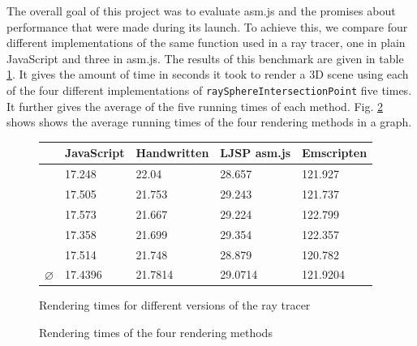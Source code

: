 \documentclass[11pt]{report}
\begin{document}
The overall goal of this project was to evaluate asm.js and the promises about performance that were made during its launch. To achieve this, we compare four different implementations of the same function used in a ray tracer, one in plain JavaScript and three in asm.js. The results of this benchmark are given in table \ref{benchmarks}. It gives the amount of time in seconds it took to render a 3D scene using each of the four different implementations of \texttt{raySphereIntersectionPoint} five times. It further gives the average of the five running times of each method. Fig. \ref{benchmarksgraph} shows shows the average running times of the four rendering methods in a graph.

\begin{figure}[ht]
\begin{center}
  \begin{tabular}{ l | l | l | l | l }
    & JavaScript & Handwritten & LJSP asm.js & Emscripten \\ \hline
    & 17.248 & 22.04 & 28.657 & 121.927 \\
    & 17.505 & 21.753 & 29.243 & 121.737 \\
    & 17.573 & 21.667 & 29.224 & 122.799 \\
    & 17.358 & 21.699 & 29.354 & 122.357 \\
    & 17.514 & 21.748 & 28.879 & 120.782 \\ \hline
    $\varnothing$ & 17.4396 & 21.7814 & 29.0714 & 121.9204 \\
  \end{tabular}
\end{center}
\caption{Rendering times for different versions of the ray tracer}
\label{benchmarks}
\end{figure}


\begin{figure}[ht]



  
  \caption{Rendering times of the four rendering methods}
  \label{benchmarksgraph}
\end{figure}
\end{document}
